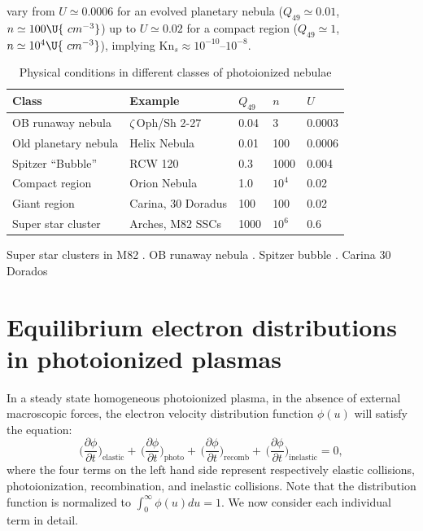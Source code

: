 \documentclass{emulateapj}
\newcommand\Kn{\ensuremath{\mathrm{Kn}}}
\newcommand\hii{\ion{H}{2}}
\begin{document}
vary from \(U \simeq 0.0006\)
for an evolved planetary nebula (\(Q_{49} \simeq 0.01\),
\(n \simeq 100\U{\ cm^{-3}}\))
up to \(U \simeq 0.02\)
for a compact \hii{} region (\(Q_{49} \simeq 1\),
\(n \simeq 10^{4}\U{\ cm^{-3}}\)),
implying \(\Kn_{s} \approx 10^{-10}\)--\(10^{-8}\).

\begin{table}
  \centering
  \caption{Physical conditions in different classes of photoionized nebulae}
  \label{tab:ion-param}
  \begin{tabular}{lllll}\hline
    Class & Example & \(Q_{49}\) & \(n\) & \(U\)\\ \hline
    OB runaway nebula & \(\zeta\)\,Oph/Sh 2-27 & 0.04 & 3 & 0.0003 \\
    Old planetary nebula & Helix Nebula & 0.01 & 100 & 0.0006 \\
    Spitzer ``Bubble'' & RCW 120 & 0.3 & 1000 & 0.004 \\
    Compact \hii{} region & Orion Nebula & 1.0 & \(10^4\) & 0.02 \\
    Giant \hii{} region & Carina, 30 Doradus &  100 & 100 & 0.02 \\ 
    Super star cluster & Arches, M82 SSCs & 1000 & \(10^6\) & 0.6 \\
    \hline
  \end{tabular}
\end{table}

Super star clusters in M82 \citep{McCrady:2007a, Krumholz:2009a}.  OB
runaway nebula \citep{Gvaramadze:2012a}.  Spitzer bubble
\citep{Deharveng:2009a}. Carina \citep{Smith:2008a} 30 Dorados \citep{Torres-Flores:2013a}

\section{Equilibrium electron distributions in photoionized plasmas}
\label{sec:equil-electr-distr}
In a steady state homogeneous photoionized plasma, in the absence of
external macroscopic forces, the electron velocity distribution
function \(\phi(u)\) will satisfy the equation:
\newcommand\XXdphidt{\ensuremath{\frac{\partial \phi}{\partial t}}}
\newcommand\Xdphidt{\ensuremath{\partial \phi/\partial t}}
\newcommand\DphiDt[1]{\biggl( \XXdphidt \biggr)_{\!\scriptscriptstyle\mathrm{#1}}}
\newcommand\dphidt[1]{\ensuremath{(\Xdphidt)_{\scriptscriptstyle\mathrm{#1}}}}
\begin{equation}
  \label{eq:1}
  \DphiDt{elastic} \!\!+\, \DphiDt{photo} \!\!+\, \DphiDt{recomb} \!\!+\, \DphiDt{inelastic} \!\!= 0, 
\end{equation}
where the four terms on the left hand side represent respectively
elastic collisions, photoionization, recombination, and inelastic
collisions.  Note that the distribution function is normalized to
\(\int_0^\infty \phi(u) du = 1\).  We now consider each individual term in detail.
\end{document}
